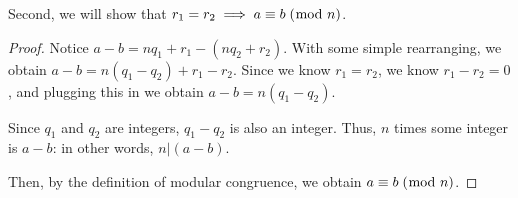 \documentclass[../main.tex]{subfiles}
\begin{document}
Second, we will show that $r_1 = r_2 \implies a \equiv b \; (\bmod \; n)$.
\begin{proof}
  Notice $a - b = nq_1 + r_1 - (nq_2 + r_2)$. With some simple rearranging, we obtain $a - b = n(q_1 - q_2) + r_1 - r_2$. Since we know $r_1 = r_2$, we know $r_1 - r_2 = 0$, and plugging this in we obtain $a - b = n(q_1 - q_2)$.

  Since $q_1$ and $q_2$ are integers, $q_1 - q_2$ is also an integer. Thus, $n$ times some integer is $a - b$: in other words, $n | (a-b)$.

  Then, by the definition of modular congruence, we obtain $a \equiv b \; (\bmod \; n)$.
\end{proof}
\end{document}
